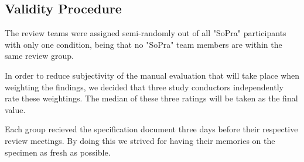 \subsection{Validity Procedure}

The review teams were assigned semi-randomly out of all "SoPra" participants with only one condition, being that no "SoPra" team members are within the same review group.

In order to reduce subjectivity of the manual evaluation that will take place when weighting the findings, we decided that three study conductors independently rate these weightings. The median of these three ratings will be taken as the final value.

Each group recieved the specification document three days before their respective review meetings. By doing this we strived for having their memories on the specimen as fresh as possible.